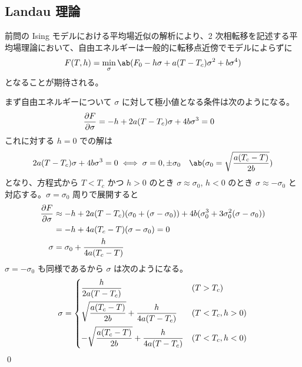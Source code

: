 \documentclass[uplatex,dvipdfmx,a4paper,11pt]{jlreq}
\makeatletter
\numberwithin{equation}{section}
\theoremstyle{definition}
\renewenvironment{proof}[1][\proofname]{\par
  \normalfont
  \topsep6\p@\@plus6\p@ \trivlist
  \item[\hskip\labelsep{\bfseries #1}\@addpunct{\bfseries}]\ignorespaces\quad\par
}{%
  \qed\endtrivlist\@endpefalse
}
\renewcommand\proofname{証明}
\makeatother
\begin{document}
\subsection{Landau 理論}
\begin{problem}
前問の Ising モデルにおける平均場近似の解析により、2 次相転移を記述する平均場理論において、自由エネルギーは一般的に転移点近傍でモデルによらずに
\begin{align}
  F(T, h) = \min_\sigma\ab(F_0 - h\sigma + a(T - T_c)\sigma^2 + b\sigma^4)
\end{align}
となることが期待される。
\end{problem}
\begin{proof}
  まず自由エネルギーについて $\sigma$ に対して極小値となる条件は次のようになる。
  \begin{align}
    \diffp{F}{\sigma} & = -h + 2a(T - T_c)\sigma + 4b\sigma^3 = 0
  \end{align}
  これに対する $h = 0$ での解は
  \begin{align}
    2a(T - T_c)\sigma + 4b\sigma^3 = 0 \iff \sigma & = 0, \pm\sigma_0 & \ab(\sigma_0 = \sqrt{\frac{a(T_c - T)}{2b}})
  \end{align}
  となり、方程式から $T < T_c$ かつ $h > 0$ のとき $\sigma \approx \sigma_0$, $h < 0$ のとき $\sigma \approx -\sigma_0$ と対応する。$\sigma = \sigma_0$ 周りで展開すると
  \begin{align}
    \diffp{F}{\sigma} & \approx -h + 2a(T - T_c)(\sigma_0 + (\sigma - \sigma_0)) + 4b(\sigma_0^3 + 3\sigma_0^2(\sigma - \sigma_0)) \\
                      & = -h + 4a(T_c - T)(\sigma - \sigma_0) = 0                                                                  \\
    \sigma            & = \sigma_0 + \frac{h}{4a(T_c - T)}
  \end{align}
  $\sigma = -\sigma_0$ も同様であるから $\sigma$ は次のようになる。
  \begin{align}
    \sigma =
    \begin{dcases}
      \frac{h}{2a(T - T_c)}                                 & (T > T_c)        \\
      \sqrt{\frac{a(T_c - T)}{2b}} + \frac{h}{4a(T - T_c)}  & (T < T_c, h > 0) \\
      -\sqrt{\frac{a(T_c - T)}{2b}} + \frac{h}{4a(T - T_c)} & (T < T_c, h < 0) \\
    \end{dcases}
  \end{align}
\end{proof}
\end{document}
